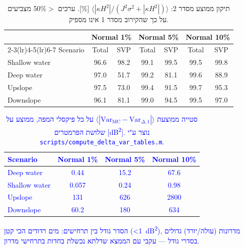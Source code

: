 \documentclass[12pt,a4paper]{article}
\newcommand{\Var}{\mathrm{Var}}
\DeclareRobustCommand{\aiedit}[1]{\textcolor{blue}{#1}}
\begin{document}
\begin{table}[H]
  \centering
  \caption{תיקון ממוצע מסדר 2:
           $\langle|\kappa H^2|/(J^2\sigma^2 + |\kappa H^2|)\rangle$ [\%].
           ערכים $>$50\%{} מצביעים על כך שהקירוב מסדר 1 אינו מספיק.}
  \label{tab:2nd_order_correction}
  \begin{english}
  \begin{tabular}{lcccccc}
    \toprule
    & \multicolumn{2}{c}{Normal 1\%} & \multicolumn{2}{c}{Normal 5\%}
    & \multicolumn{2}{c}{Normal 10\%} \\
    \cmidrule(lr){2-3}\cmidrule(lr){4-5}\cmidrule(lr){6-7}
    Scenario & Total & SVP & Total & SVP & Total & SVP \\
    \midrule
    Shallow water & 96.6 & 98.2 & 99.1 & 99.5 & 99.5 & 99.8 \\
    Deep water    & 97.0 & 51.7 & 99.2 & 81.1 & 99.6 & 88.9 \\
    Upslope       & 97.5 & 73.0 & 99.4 & 91.5 & 99.7 & 95.3 \\
    Downslope     & 96.1 & 81.1 & 99.0 & 94.5 & 99.5 & 97.0 \\
    \bottomrule
  \end{tabular}
  \end{english}
\end{table}
\aiedit{
\begin{table}[H]
  \centering
  \caption{סטייה ממוצעת $\langle|\Var_{\mathrm{MC}}-\Var_{\Delta,1}|\rangle$ על כל פיקסלי המפה,
           ממוצע על שלושת הפרמטרים [\textenglish{dB}\textsuperscript{2}].
           נוצר ע"י \texttt{scripts/compute\_delta\_var\_tables.m}.}
  \label{tab:var_deviation}
  \begin{english}
  \begin{tabular}{lccc}
    \toprule
    Scenario & Normal 1\% & Normal 5\% & Normal 10\% \\
    \midrule
    Deep water    & 0.44  & 15.2 & 67.6 \\
    Shallow water & 0.057 & 0.24 & 0.98 \\
    Upslope       & 131   & 626  & 2800 \\
    Downslope     & 60.2  & 180  & 634  \\
    \bottomrule
  \end{tabular}
  \end{english}
\end{table}
הסדר גודל בין תרחישים: מים רדודים הכי קטן (\textless1~dB\textsuperscript{2}), מדרונות (עולה/יורד)
גדולים בסדרי גודל — עקבי עם הממצא שדלתא נכשלת בחדות בתרחישי מדרון.}
\end{document}
